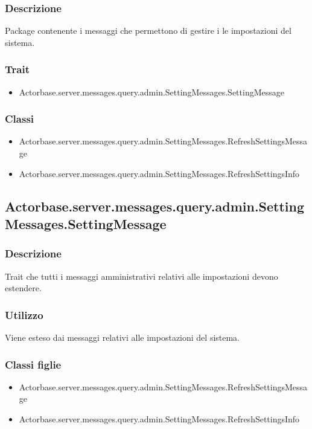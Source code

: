 \documentclass[a4paper]{article}
\begin{document}
			\subsubsection{Descrizione}
				Package contenente i messaggi che permettono di gestire i le impostazioni del sistema.
			\subsubsection{Trait}
				\begin{itemize}
					\item Actorbase.server.messages.query.admin.SettingMessages.SettingMessage
				\end{itemize}
				
			\subsubsection{Classi}
				\begin{itemize}
					\item Actorbase.server.messages.query.admin.SettingMessages.RefreshSettingsMessage
					\item Actorbase.server.messages.query.admin.SettingMessages.RefreshSettingsInfo
					\end{itemize}
					
				\subsection{Actorbase.server.messages.query.admin.SettingMessages.SettingMessage}
			\subsubsection{Descrizione}
				Trait che tutti i messaggi amministrativi relativi alle impostazioni devono estendere.
			\subsubsection{Utilizzo}
				Viene esteso dai messaggi relativi alle impostazioni del sistema.
			\subsubsection{Classi figlie}
				\begin{itemize}
					\item Actorbase.server.messages.query.admin.SettingMessages.RefreshSettingsMessage
					\item Actorbase.server.messages.query.admin.SettingMessages.RefreshSettingsInfo
				\end{itemize}
				
\end{document}
